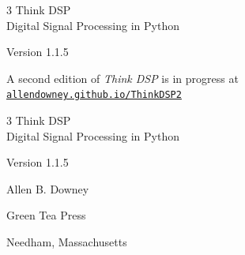 \documentclass[12pt]{book}
\newcommand{\thetitle}{Think DSP}
\newcommand{\thesubtitle}{Digital Signal Processing in Python}
\newcommand{\theversion}{1.1.5}
\begin{document}
\begin{latexonly}

\renewcommand{\topfraction}{0.9}
\renewcommand{\blankpage}{\thispagestyle{empty} \quad \newpage}


\thispagestyle{empty}

\begin{flushright}
\vspace*{2.0in}

\begin{spacing}{3}
{\huge \thetitle}\\
{\Large \thesubtitle}
\end{spacing}

\vspace{0.25in}

Version \theversion

\vfill

{\large A second edition of \emph{Think DSP} is in progress at\\
\href{https://allendowney.github.io/ThinkDSP2/}{\nolinkurl{allendowney.github.io/ThinkDSP2}}}

\end{flushright}


\blankpage
\blankpage

\pagebreak
\thispagestyle{empty}

\begin{flushright}
\vspace*{2.0in}

\begin{spacing}{3}
{\huge \thetitle}\\
{\Large \thesubtitle}
\end{spacing}

\vspace{0.25in}

Version \theversion

\vspace{1in}


{\Large
Allen B. Downey\\
}


\vspace{0.5in}

{\Large Green Tea Press}

{\small Needham, Massachusetts}


\end{flushright}
\end{latexonly}
\end{document}
